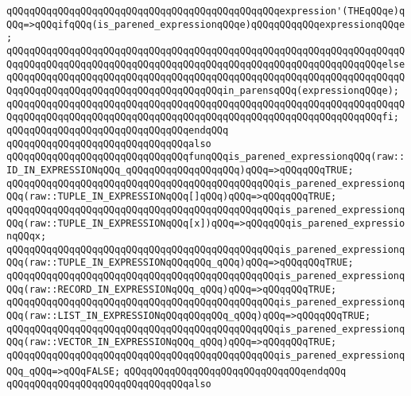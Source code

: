 \verb|qQQqqQQqqQQqqQQqqQQqqQQqqQQqqQQqqQQqqQQqqQQqqQQqexpression'(THEqQQqe)qQQq=>qQQqifqQQq(is_parened_expressionqQQqe)qQQqqQQqqQQqexpressionqQQqe;|\newline
\verb|qQQqqQQqqQQqqQQqqQQqqQQqqQQqqQQqqQQqqQQqqQQqqQQqqQQqqQQqqQQqqQQqqQQqqQQqqQQqqQQqqQQqqQQqqQQqqQQqqQQqqQQqqQQqqQQqqQQqqQQqqQQqqQQqqQQqqQQqelseqQQqqQQqqQQqqQQqqQQqqQQqqQQqqQQqqQQqqQQqqQQqqQQqqQQqqQQqqQQqqQQqqQQqqQQqqQQqqQQqqQQqqQQqqQQqqQQqqQQqqQQqqQQqin_parensqQQq(expressionqQQqe);|\newline
\verb|qQQqqQQqqQQqqQQqqQQqqQQqqQQqqQQqqQQqqQQqqQQqqQQqqQQqqQQqqQQqqQQqqQQqqQQqqQQqqQQqqQQqqQQqqQQqqQQqqQQqqQQqqQQqqQQqqQQqqQQqqQQqqQQqqQQqqQQqfi;|\newline
\verb|qQQqqQQqqQQqqQQqqQQqqQQqqQQqqQQqendqQQq|\newline
\newline
\verb|qQQqqQQqqQQqqQQqqQQqqQQqqQQqqQQqalso|\newline
\verb|qQQqqQQqqQQqqQQqqQQqqQQqqQQqqQQqfunqQQqis_parened_expressionqQQq(raw::ID_IN_EXPRESSIONqQQq_qQQqqQQqqQQqqQQqqQQq)qQQq=>qQQqqQQqTRUE;|\newline
\verb|qQQqqQQqqQQqqQQqqQQqqQQqqQQqqQQqqQQqqQQqqQQqqQQqis_parened_expressionqQQq(raw::TUPLE_IN_EXPRESSIONqQQq[]qQQq)qQQq=>qQQqqQQqTRUE;|\newline
\verb|qQQqqQQqqQQqqQQqqQQqqQQqqQQqqQQqqQQqqQQqqQQqqQQqis_parened_expressionqQQq(raw::TUPLE_IN_EXPRESSIONqQQq[x])qQQq=>qQQqqQQqis_parened_expressionqQQqx;|\newline
\verb|qQQqqQQqqQQqqQQqqQQqqQQqqQQqqQQqqQQqqQQqqQQqqQQqis_parened_expressionqQQq(raw::TUPLE_IN_EXPRESSIONqQQqqQQq_qQQq)qQQq=>qQQqqQQqTRUE;|\newline
\verb|qQQqqQQqqQQqqQQqqQQqqQQqqQQqqQQqqQQqqQQqqQQqqQQqis_parened_expressionqQQq(raw::RECORD_IN_EXPRESSIONqQQq_qQQq)qQQq=>qQQqqQQqTRUE;|\newline
\verb|qQQqqQQqqQQqqQQqqQQqqQQqqQQqqQQqqQQqqQQqqQQqqQQqis_parened_expressionqQQq(raw::LIST_IN_EXPRESSIONqQQqqQQqqQQq_qQQq)qQQq=>qQQqqQQqTRUE;|\newline
\verb|qQQqqQQqqQQqqQQqqQQqqQQqqQQqqQQqqQQqqQQqqQQqqQQqis_parened_expressionqQQq(raw::VECTOR_IN_EXPRESSIONqQQq_qQQq)qQQq=>qQQqqQQqTRUE;|\newline
\verb|qQQqqQQqqQQqqQQqqQQqqQQqqQQqqQQqqQQqqQQqqQQqqQQqis_parened_expressionqQQq_qQQq=>qQQqFALSE;|\newline
\verb|qQQqqQQqqQQqqQQqqQQqqQQqqQQqqQQqendqQQq|\newline
\newline
\verb|qQQqqQQqqQQqqQQqqQQqqQQqqQQqqQQqalso|\newline
